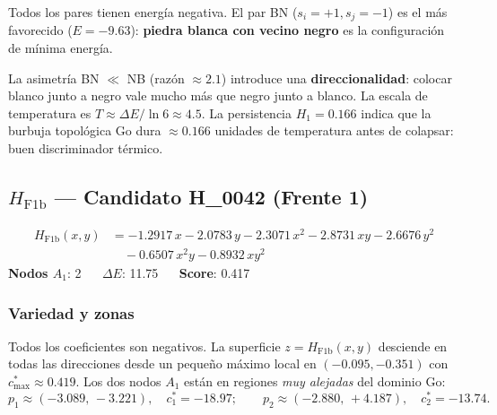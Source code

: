 \documentclass[11pt,a4paper]{article}
\newcommand{\dE}{\Delta E}
\begin{document}
Todos los pares tienen energía negativa. El par BN ($s_i=+1, s_j=-1$)
es el más favorecido ($E=-9.63$): \textbf{piedra blanca con vecino negro}
es la configuración de mínima energía.

\begin{tcolorbox}[notebox,title={Lectura estratégica y temperatura}]
La asimetría BN $\ll$ NB (razón $\approx 2.1$) introduce una
\textbf{direccionalidad}: colocar blanco junto a negro vale mucho más que
negro junto a blanco. La escala de temperatura es $T\approx\dE/\ln 6\approx 4.5$.
La persistencia $H_1=0.166$ indica que la burbuja topológica Go dura $\approx 0.166$
unidades de temperatura antes de colapsar: buen discriminador térmico.
\end{tcolorbox}

\subsection{\texorpdfstring{$H_{\text{F1b}}$}{H\_F1b} --- Candidato H\_0042 (Frente 1)}

\begin{tcolorbox}[hambox,title={$H_{\text{F1b}}$ (H\_0042, \textcolor{cFront1}{Frente 1}) $\cdot$
  $H_1$-max = 0.1204 $\cdot$ Rob = 1.000}]
\begin{align*}
  H_{\text{F1b}}(x,y) &=
    -1.2917\,x - 2.0783\,y
    - 2.3071\,x^2 - 2.8731\,xy - 2.6676\,y^2 \\
  &\quad - 0.6507\,x^2y - 0.8932\,xy^2
\end{align*}
\textbf{Nodos $A_1$}: 2 $\quad$
\textbf{$\dE$}: 11.75 $\quad$
\textbf{Score}: 0.417
\end{tcolorbox}

\subsubsection*{Variedad y zonas}

Todos los coeficientes son negativos. La superficie
$z = H_{\text{F1b}}(x,y)$ desciende en todas las direcciones desde un
pequeño máximo local en $(-0.095, -0.351)$ con $c^*_{\max}\approx 0.419$.
Los dos nodos $A_1$ están en regiones \emph{muy alejadas} del dominio Go:
\[
  p_1\approx(-3.089,\,-3.221),\quad c^*_1=-18.97;\qquad
  p_2\approx(-2.880,\,+4.187),\quad c^*_2=-13.74.
\]
\end{document}
